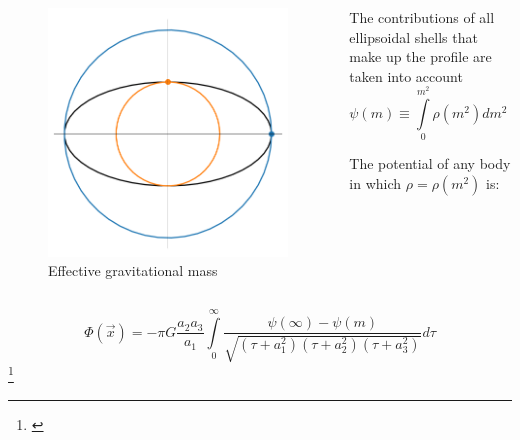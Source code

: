 \documentclass{beamer}
\newcommand\blfootnote[1]
{%
	\begingroup
	\renewcommand\thefootnote{}\footnote{#1}%
	\addtocounter{footnote}{-1}%
	\endgroup
}
\newcommand{\fcite}[1]{\blfootnote{\tiny\cite{#1}}}
\begin{document}
\begin{frame}
	\begin{columns}
		\begin{column}{0.3\linewidth}
			\begin{figure}[h]
				\centering
				\includegraphics[width = \linewidth]{"../Files/Week 7/triaxial_mass_issue"}
				\caption{Effective gravitational mass}
				\label{fig: triaxial_mass_issue}
			\end{figure}
		\end{column}
		\begin{column}{0.7\linewidth}
			The contributions of all ellipsoidal shells that make up the profile are taken into account
			\begin{equation}
				\psi(m) \equiv \int\limits_{0}^{m^2} \rho(m^2)dm^2 = \int\limits_{0}^{k = m^2} \rho(k)dk
			\end{equation}
			
			The potential of any body in which $\rho = \rho(m^2)$ is:
		\end{column}
	\end{columns}
	\begin{equation}\label{eq: generalPotential}
	\Phi(\vec{x}) = -\pi G \dfrac{a_2a_3}{a_1}\int\limits_{0}^{\infty}\dfrac{\psi(\infty) - \psi(m)}{\sqrt{(\tau + a_1^2)(\tau + a_2^2)(\tau + a_3^2)}}d\tau
	\end{equation}
	\fcite{binney2011galactic}
\end{frame}
\end{document}
